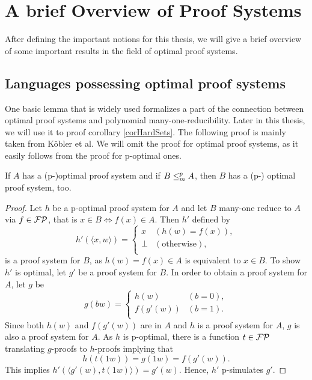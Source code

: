\chapter{A brief Overview of Proof Systems} \label{chpOverview}
  After defining the important notions for this thesis, we will give a brief overview of some important results in the field of optimal proof systems.
  
  \section{Languages possessing optimal proof systems}
  
  One basic lemma that is widely used formalizes a part of the connection between optimal proof systems and polynomial many-one-reducibility. Later in this thesis, we will use it to proof corollary \ref{corHardSets}. The following proof is mainly taken from Köbler et al. We will omit the proof for optimal proof systems, as it easily follows from the proof for p-optimal ones.

  \begin{lemma} \label{lemManyOneProofSystem}
    If \(A\) has a (p-)optimal proof system and if \(B \leq_{m}^{p} A\), then \(B\) has a (p-) optimal proof system, too.
  \end{lemma}

  \begin{proof}
    Let \(h\) be a p-optimal proof system for \(A\) and let \(B\) many-one reduce to \(A\) via \(f \in \mathcal{FP}\), that is \(x \in B \Leftrightarrow f(x) \in A\). Then \(h'\) defined by
      \[
        h'(\langle x, w \rangle) =
        \begin{cases}
          x & (h(w) = f(x)), \\
          \perp & (\text{otherwise}), \\
        \end{cases}
      \]
    is a proof system for \(B\), as \(h(w) = f(x) \in A\) is equivalent to \(x \in B\). To show \(h'\) is optimal, let \(g'\) be a proof system for \(B\). In order to obtain a proof system for \(A\), let \(g\) be
      \[
        g(bw) =
        \begin{cases}
          h(w) & (b = 0), \\
          f(g'(w)) & (b = 1). \\
        \end{cases}
      \]
    Since both \(h(w)\) and \(f(g'(w))\) are in \(A\) and \(h\) is a proof system for \(A\), \(g\) is also a proof system for \(A\). As \(h\) is p-optimal, there is a function \(t \in \mathcal{FP}\) translating \(g\)-proofs to \(h\)-proofs implying that
    \[
      h(t(1w)) = g(1w) = f(g'(w)).
    \]
    This implies \(h'(\langle g'(w), t(1w) \rangle ) = g'(w)\). Hence, \(h'\) p-simulates \(g'\).
  \end{proof}

